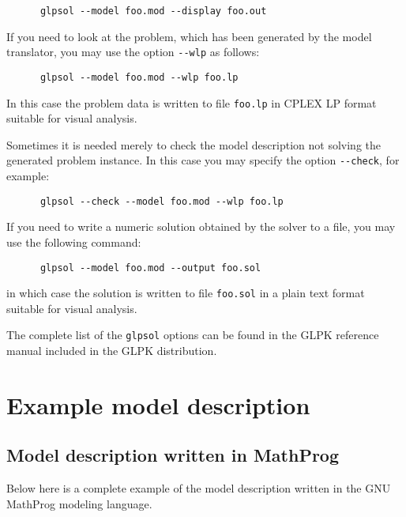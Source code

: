 \documentclass[11pt]{report}
\begin{document}
\begin{verbatim}
      glpsol --model foo.mod --display foo.out
\end{verbatim}

If you need to look at the problem, which has been generated by the
model translator, you may use the option \verb|--wlp| as follows:

\begin{verbatim}
      glpsol --model foo.mod --wlp foo.lp
\end{verbatim}

\noindent In this case the problem data is written to file
\verb|foo.lp| in CPLEX LP format suitable for visual analysis.

Sometimes it is needed merely to check the model description not
solving the generated problem instance. In this case you may specify
the option \verb|--check|, for example:

\begin{verbatim}
      glpsol --check --model foo.mod --wlp foo.lp
\end{verbatim}

\newpage

If you need to write a numeric solution obtained by the solver to
a file, you may use the following command:

\begin{verbatim}
      glpsol --model foo.mod --output foo.sol
\end{verbatim}

\noindent in which case the solution is written to file \verb|foo.sol|
in a plain text format suitable for visual analysis.

The complete list of the \verb|glpsol| options can be found in the
GLPK reference manual included in the GLPK distribution.


\chapter{Example model description}

\section{Model description written in MathProg}

Below here is a complete example of the model description written in
the GNU MathProg modeling language.
\end{document}
